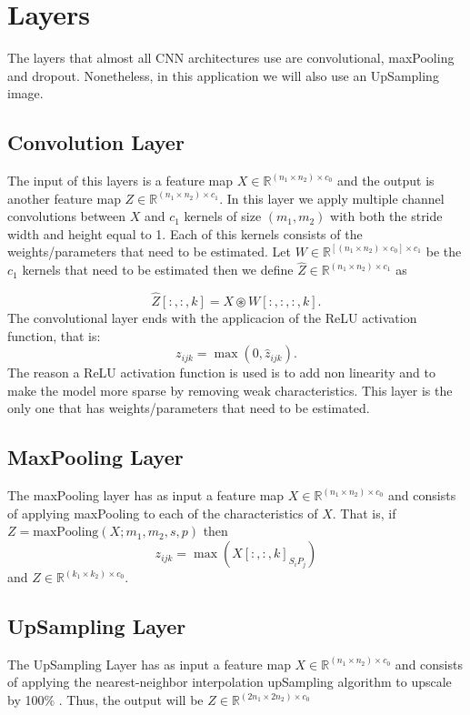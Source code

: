 \documentclass{article}
\theoremstyle{definition}
\begin{document}
\section{Layers}
The layers that almost all CNN architectures use are convolutional, maxPooling and dropout. Nonetheless, in this application we will also use an UpSampling image.

\subsection{Convolution Layer}
 The input of this layers is a feature map $X\in\mathbb{R}^{(n_1\times n_2)\times c_0}$ and the output is another feature map $Z\in\mathbb{R}^{(n_1\times n_2)\times c_1}$. In this layer we apply multiple channel convolutions between  $X$ and $c_1$ kernels of size $(m_1,m_2)$ with both the  stride width and height equal to 1. Each of this kernels consists of the weights/parameters that need to be estimated. Let $W\in\mathbb{R}^{[(n_1\times n_2)\times c_0]\times c_1}$ be the $c_1$ kernels that need to be estimated then we define $\hat{Z}\in\mathbb{R}^{(n_1\times n_2) \times c_1}$ as 

\begin{equation}
\hat{Z}[:,:,k]=X\circledast W[:,:,:,k].
\end{equation}
The convolutional layer ends with the applicacion of the ReLU activation function, that is:
\begin{equation}
z_{ijk}= \max{(0,\hat{z}_{ijk})}.
\end{equation}
The reason a ReLU activation function is used is to add non linearity and to make the model more sparse by removing weak characteristics. This layer is the only one that has weights/parameters that need to be estimated.

\subsection{MaxPooling Layer}
The maxPooling layer has as input a feature map $X\in\mathbb{R}^{(n_1\times n_2)\times c_0}$ and consists of applying maxPooling to each of the characteristics of $X$. That is, if $Z=\mbox{maxPooling}(X;m_1,m_2,s,p)$ then 
\begin{equation}
	z_{ijk} = \max(X[:,:,k]_{S_iP_j})
\end{equation}
and $Z\in\mathbb{R}^{(k_1\times k_2)\times c_0}$.
\subsection{UpSampling Layer}
The UpSampling Layer  has as input a feature map $X\in\mathbb{R}^{(n_1\times n_2)\times c_0}$ and consists of applying the nearest-neighbor interpolation upSampling algorithm to upscale by 100$\%$ . Thus, the output will be $Z\in\mathbb{R}^{(2n_1 \times 2n_2)\times c_0}$
\end{document}
